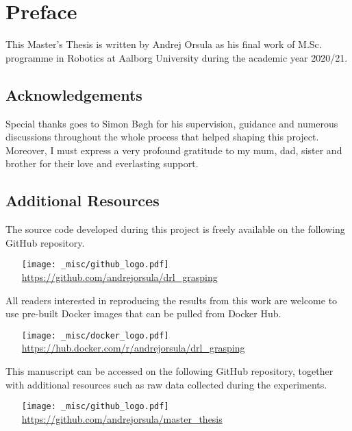 \chapter*{Preface}

This Master’s Thesis is written by Andrej Orsula as his final work of M.Sc. programme in Robotics at Aalborg University during the academic year 2020/21.


\section*{Acknowledgements}

Special thanks goes to Simon Bøgh for his supervision, guidance and numerous discussions throughout the whole process that helped shaping this project.
Moreover, I must express a very profound gratitude to my mum, dad, sister and brother for their love and everlasting support.


\section*{Additional Resources}

\noindent
The source code developed during this project is freely available on the following GitHub repository.
\vspace{-\topsep}
\begin{itemize}
    \item[{\texttt{[image: \_misc/github\_logo.pdf]}}] \href{https://github.com/andrejorsula/drl_grasping}{https://github.com/andrejorsula/drl\_grasping}
\end{itemize}
\vspace{0.5\topsep}

\noindent
All readers interested in reproducing the results from this work are welcome to use pre-built Docker images that can be pulled from Docker Hub.
\vspace{-\topsep}
\begin{itemize}
    \item[{\texttt{[image: \_misc/docker\_logo.pdf]}}] \href{https://hub.docker.com/r/andrejorsula/drl_grasping}{https://hub.docker.com/r/andrejorsula/drl\_grasping}
\end{itemize}
\vspace{0.5\topsep}

\noindent
This manuscript can be accessed on the following GitHub repository, together with additional resources such as raw data collected during the experiments.
\vspace{-\topsep}
\begin{itemize}
    \item[{\texttt{[image: \_misc/github\_logo.pdf]}}] \href{https://github.com/andrejorsula/master_thesis}{https://github.com/andrejorsula/master\_thesis}
\end{itemize}
\vspace{0.5\topsep}


